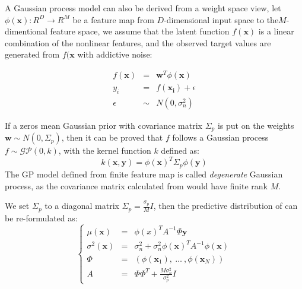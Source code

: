 A Gaussian process model can also be derived from a weight space view, let $\phi(\bm{x}): R^D \rightarrow R^M$ be a feature map from $D$-dimensional input space to the$M$-dimentional feature space, we assume that the latent function $f(\bm{x})$ is a linear combination of the nonlinear features, and the observed target values are generated from $f(\bm{x}$ with addictive noise:

\begin{equation}
    \label{eq:weightspace}
    \begin{array}{lll}
        f(\bm{x}) &=&    \bm{w}^T \phi(\bm{x})   \\
        y_i       &=&    f(\bm{x_i}) + \epsilon  \\
        \epsilon  &\sim& N(0, \sigma_n^2)
    \end{array}
\end{equation}

If a zeros mean Gaussian prior with covariance matrix $\Sigma_p$ is put on the weights $\bm{w} \sim N(0, \Sigma_p)$, then it can be proved \cite{GPML} that $f$ follows a Gaussian process $f \sim \mathcal{GP}(0, k)$, with the kernel function $k$ defined as:
\begin{equation}
    \label{eq:kernel_from_weight}
    k(\bm{x}, \bm{y}) = \phi(\bm{x})^T \Sigma_p \phi(\bm{y})
\end{equation}
The GP model defined from finite feature map is called \emph{degenerate} Gaussian process, as the covariance matrix calculated from  would have finite rank $M$.


We set $\Sigma_p$ to a diagonal matrix $\Sigma_p = \frac{\sigma_p}{M} I$, then the predictive distribution of  can be re-formulated as:
\begin{equation}
    \left\{
        \begin{array}{lll}
            \mu(\bm{x})      &= & \phi(x)^T A^{-1} \Phi \bm{y} \\
            \sigma^2(\bm{x}) &= & \sigma_n^2 + \sigma_n^2 \phi(\bm{x})^T A^{-1} \phi(\bm{x}) \\
            \Phi             &= & (\phi(\bm{x}_1),~\dots~,\phi(\bm{x}_N)) \\
            A                &= & \Phi \Phi^T + \frac{M \sigma_n^2}{\sigma_p^2} I
        \end{array}
    \right.
    \label{eq:DegeneratePred}
\end{equation}

